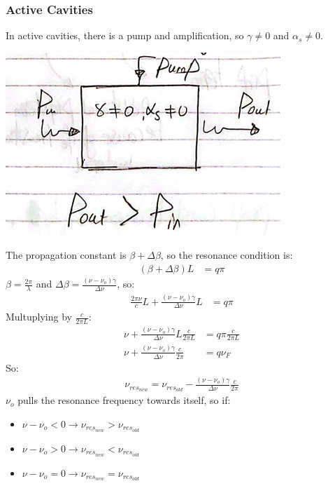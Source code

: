 \documentclass[11pt]{article}
\begin{document}
\subsubsection{Active Cavities}
In active cavities, there is a pump and amplification, so $\gamma \neq 0$ and $\alpha_s \neq 0$.
\begin{center}
    \includegraphics[scale=0.8]{2.png}
\end{center}
The propagation constant is $\beta + \Delta \beta$, so the resonance condition is:
\begin{align*}
    (\beta + \Delta \beta) L &= q \pi
\end{align*}
$\beta = \frac{2 \pi}{\lambda}$ and $\Delta \beta = \frac{(\nu - \nu_o) \gamma}{\Delta \nu}$, so:
\begin{align*}
    \frac{2 \pi \nu}{c} L + \frac{(\nu - \nu_o) \gamma}{\Delta \nu} L &= q \pi
\end{align*}
Multuplying by $\frac{c}{2 \pi L}$:
\begin{align*}
    \nu + \frac{(\nu - \nu_o) \gamma}{\Delta \nu} L \frac{c}{2 \pi L} &= q \pi \frac{c}{2 \pi L} \\
    \nu + \frac{(\nu - \nu_o) \gamma}{\Delta \nu} \frac{c}{2 \pi} &= q \nu_F
\end{align*}
So:
\begin{align*}
    \nu_{res_{new}} = \nu_{res_{old}} - \frac{(\nu - \nu_o) \gamma}{\Delta \nu} \frac{c}{2 \pi}
\end{align*}
$\nu_o$ pulls the resonance frequency towards itself, so if:
\begin{itemize}
    \item $\nu - \nu_o < 0 \rightarrow \nu_{res_{new}} > \nu_{res_{old}}$
    \item $\nu - \nu_o > 0 \rightarrow \nu_{res_{new}} < \nu_{res_{old}}$
    \item $\nu - \nu_o = 0 \rightarrow \nu_{res_{new}} = \nu_{res_{old}}$
\end{itemize}
\end{document}
